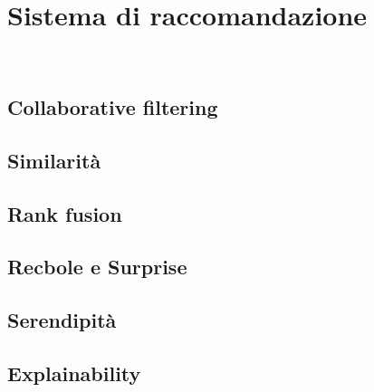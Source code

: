 \chapter{Sistema di raccomandazione}
\label{cap:sistema-raccomandazione}

\\

\section{Collaborative filtering}

\section{Similarità}

\section{Rank fusion}

\section{Recbole e Surprise}

\section{Serendipità}

\section{Explainability}
